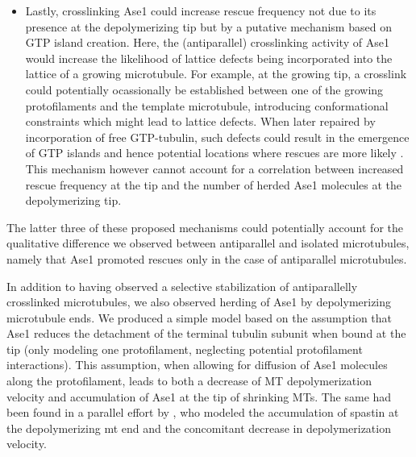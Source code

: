 \begin{itemize}
    \item Lastly, crosslinking Ase1 could increase rescue frequency not due to its presence at the depolymerizing tip but by a putative mechanism based on GTP island creation. Here, the (antiparallel) crosslinking activity of Ase1 would increase the likelihood of lattice defects being incorporated into the lattice of a growing microtubule. For example, at the growing tip, a crosslink could potentially ocassionally be established between one of the growing protofilaments and the template microtubule, introducing conformational constraints which might lead to lattice defects. When later repaired by incorporation of free GTP-tubulin, such defects could result in the emergence of GTP islands and hence potential locations where rescues are more likely . This mechanism however cannot account for a correlation between increased rescue frequency at the tip and the number of herded Ase1 molecules at the depolymerizing tip.
\end{itemize}
The latter three of these proposed mechanisms could potentially account for the qualitative difference we observed between antiparallel and isolated microtubules, namely that Ase1 promoted rescues only in the case of antiparallel microtubules.\par

In addition to having observed a selective stabilization of antiparallelly crosslinked microtubules, we also observed herding of Ase1 by depolymerizing microtubule ends. We produced a simple model based on the assumption that Ase1 reduces the detachment of the terminal tubulin subunit when bound at the tip (only modeling one protofilament, neglecting potential protofilament interactions). This assumption, when allowing for diffusion of Ase1 molecules along the protofilament, leads to both a decrease of MT depolymerization velocity and accumulation of Ase1 at the tip of shrinking MTs. The same had been found in a parallel effort by \cite{Hiyasat}, who modeled the accumulation of spastin at the depolymerizing mt end and the concomitant decrease in depolymerization velocity.\par

